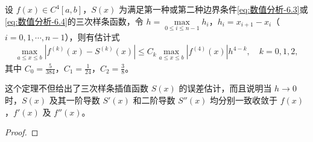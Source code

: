 \documentclass[../../main.tex]{subfiles}
\begin{document}
\begin{theorem}\label{theorem:数值分析-定理-5}
设 $f(x)\in C^4[a,b]$，$S(x)$ 为满足第一种或第二种边界条件\eqref{eq:数值分析-6.3}或\eqref{eq:数值分析-6.4}的三次样条函数，令 $h=\max\limits_{0\leqslant i\leqslant n-1} h_i$，$h_i=x_{i+1}-x_i$（$i=0,1,\cdots,n-1$），则有估计式
\begin{align}\label{eq:数值分析-6.17}
\max\limits_{a\leqslant x\leqslant b} | f^{(k)}(x) - S^{(k)}(x) | \leqslant C_k \max\limits_{a\leqslant x\leqslant b} | f^{(4)}(x) | h^{4-k}, \quad k = 0,1,2,
\end{align}
其中 $C_0=\frac{5}{384}$，$C_1=\frac{1}{24}$，$C_2=\frac{3}{8}$。
\end{theorem}
\begin{note}
这个定理不但给出了三次样条插值函数 $S(x)$ 的误差估计，而且说明当 $h\to 0$ 时，$S(x)$ 及其一阶导数 $S'(x)$ 和二阶导数 $S''(x)$ 均分别一致收敛于 $f(x)$，$f'(x)$ 及 $f''(x)$。
\end{note}
\begin{proof}


\end{proof}
\end{document}
